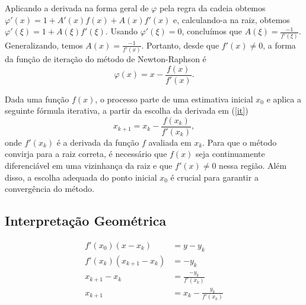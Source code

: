 Aplicando a derivada na forma geral de $\varphi$ pela regra da cadeia obtemos
$\varphi'(x) = 1 + A'(x)f(x) + A(x)f'(x)$ e, calculando-a na raiz, obtemos
$\varphi'(\xi) = 1 + A(\xi)f'(\xi)$. Usando $\varphi'(\xi) = 0$, concluímos que
$A(\xi) = \frac{-1}{f'(\xi)}$. Generalizando, temos $A(x) = \frac{-1}{f'(x)}$.
Portanto, desde que $f'(x) \neq 0$, a forma da função de iteração do método de
Newton-Raphson é
\begin{equation} \label{phiNR1d}
    \varphi(x) = x - \frac{f(x)}{f'(x)}.
\end{equation}

Dada uma função \(f(x)\), o processo parte de uma estimativa inicial \(x_0\) e
aplica a seguinte fórmula iterativa, a partir da escolha da derivada em
(\ref{it})
\begin{equation} \label{nr}
    x_{k+1} = x_k - \frac{f(x_k)}{f'(x_k)},
\end{equation}
onde \(f'(x_k)\) é a derivada da função \(f\) avaliada em \(x_k\).
Para que o método convirja para a raiz correta, é necessário que \(f(x)\) seja continuamente diferenciável em uma vizinhança da raiz e que \(f'(x) \neq 0\) nessa região. Além disso, a escolha adequada do ponto inicial \(x_0\) é crucial para garantir a convergência do método.

\subsection{Interpretação Geométrica}
\begin{align*}
    f'(x_0)(x - x_k)       & = y - y_k                   \\
    f'(x_k)(x_{k+1} - x_k) & = -y_k                      \\
    x_{k+1} - x_k          & = \frac{-y_k}{f'(x_k)}      \\
    x_{k+1}                & = x_k - \frac{y_k}{f'(x_k)}
\end{align*}
